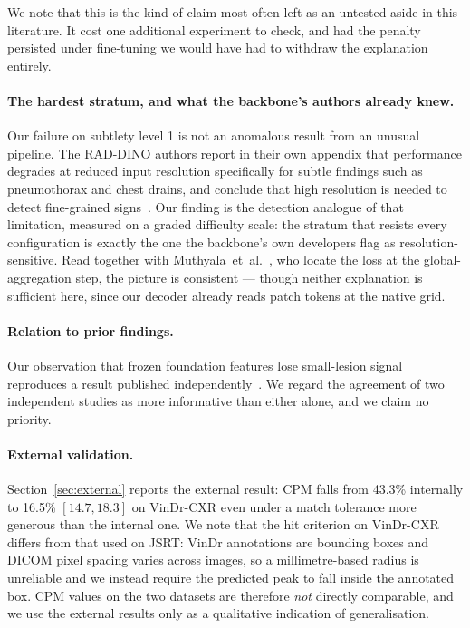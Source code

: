 \documentclass[11pt,a4paper]{article}
\begin{document}
We note that this is the kind of claim most often left as an untested aside in
this literature. It cost one additional experiment to check, and had the penalty
persisted under fine-tuning we would have had to withdraw the explanation
entirely.

\paragraph{The hardest stratum, and what the backbone's authors already knew.}
Our failure on subtlety level 1 is not an anomalous result from an unusual
pipeline. The RAD-DINO authors report in their own appendix that performance
degrades at reduced input resolution specifically for subtle findings such as
pneumothorax and chest drains, and conclude that high resolution is needed to
detect fine-grained signs~\cite{perezgarcia2024raddino}. Our finding is the
detection analogue of that limitation, measured on a graded difficulty scale:
the stratum that resists every configuration is exactly the one the backbone's
own developers flag as resolution-sensitive. Read together with
Muthyala~et~al.~\cite{muthyala2026frozen}, who locate the loss at the
global-aggregation step, the picture is consistent --- though neither
explanation is sufficient here, since our decoder already reads patch tokens at
the native grid.

\paragraph{Relation to prior findings.}
Our observation that frozen foundation features lose small-lesion signal
reproduces a result published independently~\cite{muthyala2026frozen}. We regard the
agreement of two independent studies as more informative than either alone, and
we claim no priority.

\paragraph{External validation.}
Section~\ref{sec:external} reports the external result: CPM falls from 43.3\%
internally to 16.5\% $[14.7, 18.3]$ on VinDr-CXR even under a match tolerance
more generous than the internal one. We note that the hit criterion on
VinDr-CXR~\cite{nguyen2022vindr} differs from that used on JSRT: VinDr annotations are bounding boxes
and DICOM pixel spacing varies across images, so a millimetre-based radius is
unreliable and we instead require the predicted peak to fall inside the
annotated box. CPM values on the two datasets are therefore \emph{not} directly
comparable, and we use the external results only as a qualitative indication of
generalisation.
\end{document}

